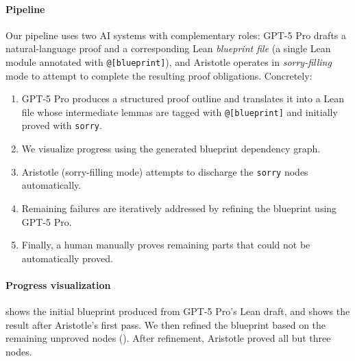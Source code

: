 \documentclass{article}
\newcommand\leancode{\lstinline[language=lean]}
\begin{document}
\paragraph{Pipeline}
Our pipeline uses two AI systems with complementary roles: GPT-5 Pro drafts a natural-language proof and a corresponding Lean \emph{blueprint file} (a single Lean module annotated with \leancode{@[blueprint]}), and Aristotle operates in \emph{sorry-filling} mode to attempt to complete the resulting proof obligations.
Concretely:
\begin{enumerate}
\item GPT-5 Pro produces a structured proof outline and translates it into a Lean file whose intermediate lemmas are tagged with \leancode{@[blueprint]} and initially proved with \leancode{sorry}.
\item We visualize progress using the generated blueprint dependency graph.
\item Aristotle (sorry-filling mode) attempts to discharge the \leancode{sorry} nodes automatically.
\item Remaining failures are iteratively addressed by refining the blueprint using GPT-5 Pro.
\item Finally, a human manually proves remaining parts that could not be automatically proved.
\end{enumerate}

\paragraph{Progress visualization}
 shows the initial blueprint produced from GPT-5 Pro's Lean draft, and  shows the result after Aristotle's first pass. We then refined the blueprint based on the remaining unproved nodes (). After refinement, Aristotle proved all but three nodes.
\end{document}
